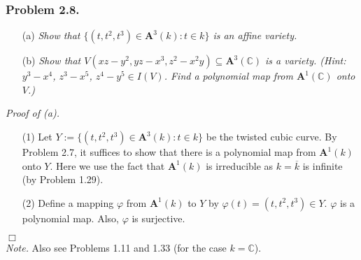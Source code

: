\documentclass{article}
\begin{document}



\subsubsection*{Problem 2.8.}
\begin{enumerate}
\item[(a)]
  \emph{Show that $\{ (t,t^2,t^3) \in \mathbf{A}^3(k) : t \in k \}$ is an affine variety.}

\item[(b)]
  \emph{Show that $V(xz-y^2, yz - x^3, z^2-x^2y) \subseteq \mathbf{A}^3(\mathbb{C})$ is a variety.
  (Hint: $y^3-x^4$, $z^3-x^5$, $z^4-y^5 \in I(V)$.
  Find a polynomial map from $\mathbf{A}^1(\mathbb{C})$ onto $V$.)} \\
\end{enumerate}



\emph{Proof of (a).}
\begin{enumerate}
\item[(1)]
  Let $Y := \{ (t,t^2,t^3) \in \mathbf{A}^3(k) : t \in k \}$ be the twisted cubic curve.
  By Problem 2.7, it suffices to show that
  there is a polynomial map from $\mathbf{A}^1(k)$ onto $Y$.
  Here we use the fact that $\mathbf{A}^1(k)$ is irreducible as $k = \overline{k}$ is infinite
  (by Problem 1.29).

\item[(2)]
  Define a mapping $\varphi$ from $\mathbf{A}^1(k)$ to $Y$ by
  $\varphi(t) = (t,t^2,t^3) \in Y$.
  $\varphi$ is a polynomial map. Also, $\varphi$ is surjective.
\end{enumerate}
$\Box$ \\

\emph{Note.}
  Also see Problems 1.11 and 1.33 (for the case $k = \mathbb{C}$). \\
\end{document}
